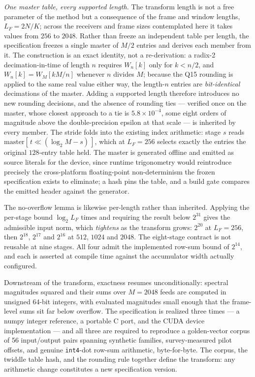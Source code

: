 \textit{One master table, every supported length.} The transform length is not a
free parameter of the method but a consequence of the frame and window lengths,
$L_F = 2N/K$; across the receivers and frame sizes contemplated here it takes
values from $256$ to $2048$. Rather than freeze an independent table per length,
the specification freezes a single master of $M/2$ entries and derives each
member from it. The construction is an exact identity, not a re-derivation: a
radix-2 decimation-in-time of length $n$ requires $W_n[k]$ only for $k < n/2$,
and $W_n[k] = W_M[kM/n]$ whenever $n$ divides $M$; because the Q15 rounding is
applied to the same real value either way, the length-$n$ entries are
\emph{bit-identical} decimations of the master. Adding a supported length
therefore introduces no new rounding decisions, and the absence of rounding ties
--- verified once on the master, whose closest approach to a tie is
$5.8 \times 10^{-4}$, some eight orders of magnitude above the double-precision
epsilon at that scale --- is inherited by every member. The stride folds into the
existing index arithmetic: stage $s$ reads $\mathrm{master}[\,t \ll (\log_2 M - s)\,]$,
which at $L_F = 256$ selects exactly the entries the original $128$-entry table
held. The master is generated offline and emitted as source literals for the
device, since runtime trigonometry would reintroduce precisely the
cross-platform floating-point non-determinism the frozen specification exists to
eliminate; a hash pins the table, and a build gate compares the emitted header
against the generator.

The no-overflow lemma is likewise per-length rather than inherited. Applying the
per-stage bound $\log_2 L_F$ times and requiring the result below $2^{31}$ gives
the admissible input norm, which \emph{tightens} as the transform grows:
$2^{20}$ at $L_F = 256$, then $2^{18}$, $2^{17}$ and $2^{16}$ at $512$, $1024$
and $2048$. The eight-stage contract is not reusable at nine stages. All four
admit the implemented row-sum bound of $2^{14}$, and each is asserted at compile
time against the accumulator width actually configured.

Downstream of the transform, exactness resumes unconditionally: spectral magnitudes squared and their sums over $M = 2048$ feeds are computed in unsigned 64-bit integers, with evaluated magnitudes small enough that the frame-level sums sit far below overflow. The specification is realized three times --- a numpy integer reference, a portable C port, and the CUDA device implementation --- and all three are required to reproduce a golden-vector corpus of 56 input/output pairs spanning synthetic families, survey-measured pilot offsets, and genuine \texttt{int4}-dot row-sum arithmetic, byte-for-byte. The corpus, the twiddle table hash, and the rounding rule together define the transform: any arithmetic change constitutes a new specification version.

